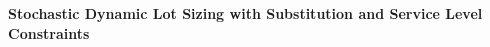 \documentclass[11pt]{article}
\def\Title#1{\begin{center} {\Large {\bf #1} } \end{center}}
\begin{document}
\Title{Stochastic Dynamic Lot Sizing with Substitution and Service Level Constraints }

\bigskip\bigskip











\begin{abstract}




\end{abstract}
\end{document}
